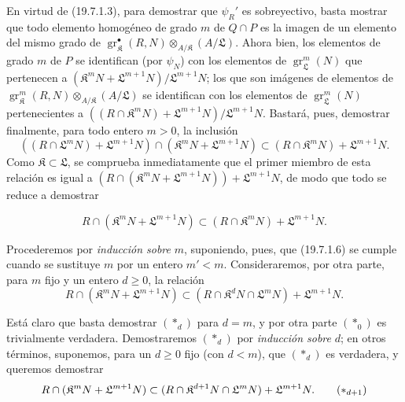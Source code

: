 \begin{env}[19.7.1.5]
\label{IV.19.7.1.5}
En virtud de (19.7.1.3), para demostrar que $\psi_R'$ es sobreyectivo, basta mostrar que todo elemento homogéneo de grado $m$ de $Q\cap P$ es la imagen de un elemento del mismo grado de $\operatorname{gr}_{\mathfrak K}^\bullet(R,N)\otimes_{A/\mathfrak K}(A/\mathfrak L)$. Ahora bien, los elementos de grado $m$ de $P$ se identifican (por $\psi_N$) con los elementos de $\operatorname{gr}_{\mathfrak L}^m(N)$ que pertenecen a $(\mathfrak K^mN+\mathfrak L^{m+1}N)/\mathfrak L^{m+1}N$; los que son imágenes de elementos de $\operatorname{gr}_{\mathfrak K}^m(R,N)\otimes_{A/\mathfrak K}(A/\mathfrak L)$ se identifican con los elementos de $\operatorname{gr}_{\mathfrak L}^m(N)$ pertenecientes a $((R\cap\mathfrak K^mN)+\mathfrak L^{m+1}N)/\mathfrak L^{m+1}N$. Bastará, pues, demostrar finalmente, para todo entero $m>0$, la inclusión
\[
  ((R\cap\mathfrak L^mN)+\mathfrak L^{m+1}N)\cap(\mathfrak K^mN+\mathfrak L^{m+1}N)\subset(R\cap\mathfrak K^mN)+\mathfrak L^{m+1}N.
\]
Como $\mathfrak K\subset\mathfrak L$, se comprueba inmediatamente que el primer miembro de esta relación es igual a $(R\cap(\mathfrak K^mN+\mathfrak L^{m+1}N))+\mathfrak L^{m+1}N$, de modo que todo se reduce a demostrar
\end{env}



\begin{equation}
  R\cap(\mathfrak K^mN+\mathfrak L^{m+1}N)\subset(R\cap\mathfrak K^mN)+\mathfrak L^{m+1}N.
  \tag{19.7.1.6}\label{IV.19.7.1.6}
\end{equation}



Procederemos por \emph{inducción sobre} $m$, suponiendo, pues, que (19.7.1.6) se cumple cuando se sustituye $m$ por un entero $m'<m$. Consideraremos, por otra parte, para $m$ fijo y un entero $d\geq0$, la relación
\begin{equation}
  R\cap(\mathfrak K^mN+\mathfrak L^{m+1}N)\subset(R\cap\mathfrak K^dN\cap\mathfrak L^mN)+\mathfrak L^{m+1}N.
  \tag{$*_d$}
\end{equation}

Está claro que basta demostrar $(*_d)$ para $d=m$, y por otra parte $(*_0)$ es trivialmente verdadera. Demostraremos $(*_d)$ por \emph{inducción sobre} $d$; en otros términos, suponemos, para un $d\geq0$ fijo (con $d<m$), que $(*_d)$ es verdadera, y queremos demostrar
\begin{equation}
  R\cap(\mathfrak K^mN+\mathfrak L^{m+1}N)\subset(R\cap\mathfrak K^{d+1}N\cap\mathfrak L^mN)+\mathfrak L^{m+1}N.
  \tag{$*_{d+1}$}
\end{equation}

